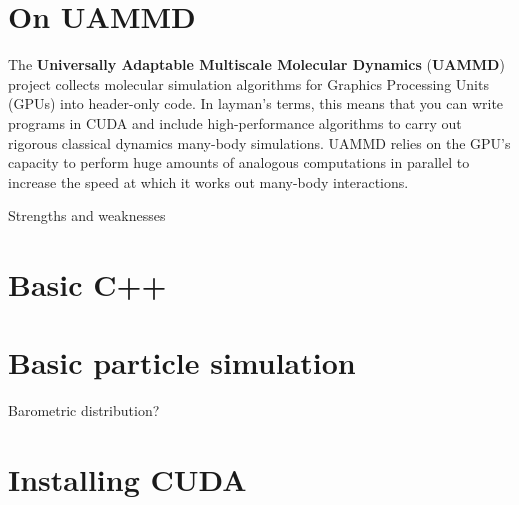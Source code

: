 \section*{On UAMMD}

The \textbf{Universally Adaptable Multiscale Molecular Dynamics} 
(\textbf{UAMMD}) project collects molecular simulation algorithms for Graphics 
Processing Units (GPUs) into header-only code. In layman's terms, this means 
that you can write programs in CUDA and include high-performance algorithms to 
carry out rigorous classical dynamics many-body simulations. UAMMD relies on the 
GPU's capacity to perform huge amounts of analogous computations in parallel to 
increase the speed at which it works out many-body interactions.

Strengths and weaknesses

\section*{Basic C++}

\section*{Basic particle simulation}

Barometric distribution?

\section*{Installing CUDA}

